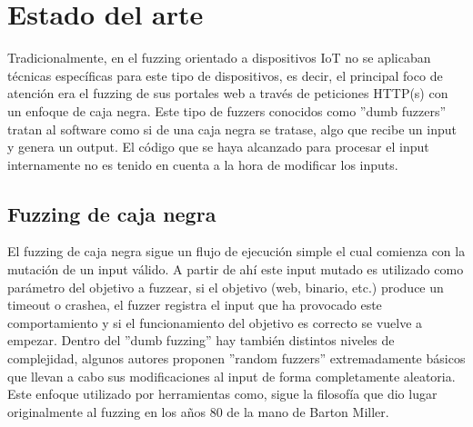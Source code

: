 \chapter{Estado del arte}
\label{estado_del_arte}
Tradicionalmente, en el fuzzing orientado a dispositivos IoT no se aplicaban técnicas
específicas para este tipo de dispositivos, es decir, el principal foco de atención era el fuzzing de sus portales web a través 
de peticiones HTTP(s) con un enfoque de caja negra. Este tipo de fuzzers conocidos como ''dumb fuzzers'' tratan al software como si de una caja negra se tratase, 
algo que recibe un input y genera un output. El código que se haya alcanzado para procesar el input internamente no es tenido en
cuenta a la hora de modificar los inputs.

\section{Fuzzing de caja negra}
El fuzzing de caja negra sigue un flujo de ejecución simple el cual comienza con la mutación de un input válido.
A partir de ahí este input mutado es utilizado como parámetro del objetivo a fuzzear, si el 
objetivo (web, binario, etc.) produce un timeout o crashea, el fuzzer registra el input que 
ha provocado este comportamiento y si el funcionamiento del objetivo es correcto se vuelve a empezar. Dentro del ''dumb fuzzing'' hay también
distintos niveles de complejidad, algunos autores proponen ''random fuzzers'' extremadamente básicos que 
llevan a cabo sus modificaciones al input de forma completamente aleatoria. Este enfoque utilizado por 
herramientas como\cite{zzuf}, sigue la filosofía que dio lugar originalmente al fuzzing en 
los años 80 de la mano de Barton Miller\cite{Miller1990}.

